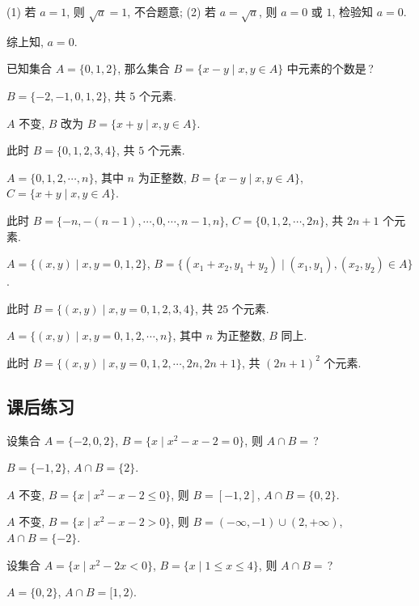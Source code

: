 \beginsolution
  (1) 若 $a=1$, 则 $\sqrt{a}=1$, 不合题意;
  (2) 若 $a=\sqrt{a}$, 则 $a=0$ 或 $1$, 检验知 $a=0$.
  
  综上知, $a=0$.
\endsolution

\begin{exercise}
  已知集合 $A=\{0,1,2\}$, 那么集合 $B=\{x-y\mid x,y\in A\}$ 中元素的个数是\,?
\end{exercise}

\beginsolution
  $B=\{-2,-1,0,1,2\}$, 共 $5$ 个元素.
  
  \varexercise $A$ 不变, $B$ 改为 $B=\{x+y\mid x,y\in A\}$.
  
  此时 $B=\{0,1,2,3,4\}$, 共 $5$ 个元素.
  
  \varexercise $A=\{0,1,2,\cdots,n\}$, 其中 $n$ 为正整数, $B=\{x-y\mid x,y\in A\}$, $C=\{x+y\mid x,y\in A\}$.
  
  此时 $B=\{-n,-(n-1),\cdots,0,\cdots,n-1,n\}$, 
  $C=\{0,1,2,\cdots,2n\}$, 共 $2n+1$ 个元素.
  
  \varexercise $A=\{(x,y)\mid x,y=0,1,2\}$, $B=\{(x_1+x_2,y_1+y_2)\mid (x_1,y_1), (x_2,y_2)\in A\}$.
  
  此时 $B=\{(x,y)\mid x,y=0,1,2,3,4\}$, 共 $25$ 个元素.
  
  \varexercise $A=\{(x,y)\mid x,y=0,1,2,\cdots,n\}$, 其中 $n$ 为正整数, $B$ 同上.
  
  此时 $B=\{(x,y)\mid x,y=0,1,2,\cdots,2n,2n+1\}$, 共 $(2n+1)^2$ 个元素.
\endsolution

\subsection{课后练习}
\begin{exercise}
  设集合 $A=\{-2,0,2\}$, $B=\{x\mid x^2-x-2=0\}$, 则 $A\cap B=$\,?
\end{exercise}

\beginsolution
  $B=\{-1,2\}$, $A\cap B=\{2\}$.
  
  \varexercise $A$ 不变, $B=\{x\mid x^2-x-2\leqslant 0\}$, 则 $B=[-1,2]$, $A\cap B=\{0,2\}$.
  
  \varexercise $A$ 不变, $B=\{x\mid x^2-x-2> 0\}$, 则 $B=(-\infty,-1)\cup(2,+\infty)$, $A\cap B=\{-2\}$.
\endsolution

\begin{exercise}
  设集合 $A=\{x\mid x^2-2x<0\}$, $B=\{x\mid 1\leqslant x\leqslant 4\}$, 
  则 $A\cap B=$\,?
\end{exercise}

\beginsolution
  $A=\{0,2\}$, $A\cap B=[1,2)$.
\endsolution

